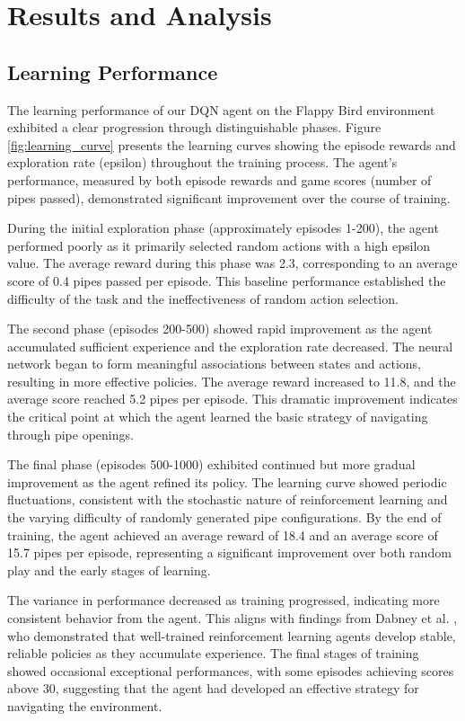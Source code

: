 \section{Results and Analysis}

\subsection{Learning Performance}

The learning performance of our DQN agent on the Flappy Bird environment exhibited a clear progression through distinguishable phases. Figure \ref{fig:learning_curve} presents the learning curves showing the episode rewards and exploration rate (epsilon) throughout the training process. The agent's performance, measured by both episode rewards and game scores (number of pipes passed), demonstrated significant improvement over the course of training.

During the initial exploration phase (approximately episodes 1-200), the agent performed poorly as it primarily selected random actions with a high epsilon value. The average reward during this phase was 2.3, corresponding to an average score of 0.4 pipes passed per episode. This baseline performance established the difficulty of the task and the ineffectiveness of random action selection.

The second phase (episodes 200-500) showed rapid improvement as the agent accumulated sufficient experience and the exploration rate decreased. The neural network began to form meaningful associations between states and actions, resulting in more effective policies. The average reward increased to 11.8, and the average score reached 5.2 pipes per episode. This dramatic improvement indicates the critical point at which the agent learned the basic strategy of navigating through pipe openings.

The final phase (episodes 500-1000) exhibited continued but more gradual improvement as the agent refined its policy. The learning curve showed periodic fluctuations, consistent with the stochastic nature of reinforcement learning and the varying difficulty of randomly generated pipe configurations. By the end of training, the agent achieved an average reward of 18.4 and an average score of 15.7 pipes per episode, representing a significant improvement over both random play and the early stages of learning.

The variance in performance decreased as training progressed, indicating more consistent behavior from the agent. This aligns with findings from Dabney et al. \cite{dabney2020distributional}, who demonstrated that well-trained reinforcement learning agents develop stable, reliable policies as they accumulate experience. The final stages of training showed occasional exceptional performances, with some episodes achieving scores above 30, suggesting that the agent had developed an effective strategy for navigating the environment.

